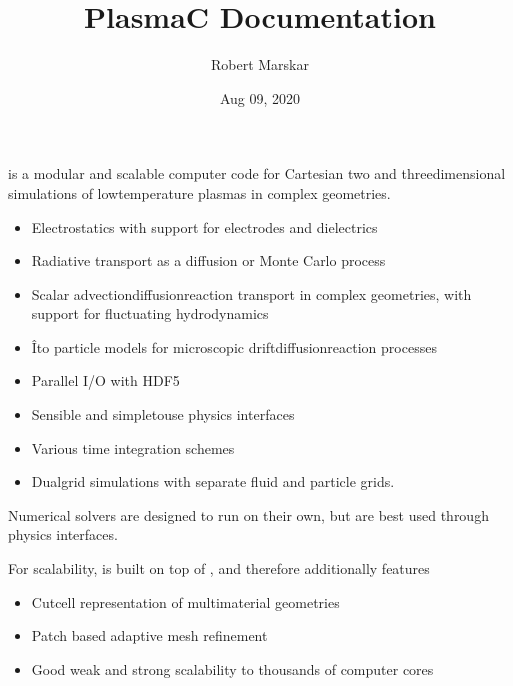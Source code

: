 \documentclass[letterpaper,10pt,english]{sphinxmanual}
\title{PlasmaC Documentation}
\date{Aug 09, 2020}
\author{Robert Marskar}
\begin{document}
\pagestyle{empty}
\sphinxmaketitle
\pagestyle{plain}
\sphinxtableofcontents
\pagestyle{normal}
\label{\detokenize{index::doc}}



 is a modular and scalable computer code for Cartesian two\sphinxhyphen{} and three\sphinxhyphen{}dimensional simulations of low\sphinxhyphen{}temperature plasmas in complex geometries.
\begin{itemize}
\item {} 
Electrostatics with support for electrodes and dielectrics

\item {} 
Radiative transport as a diffusion or Monte Carlo process

\item {} 
Scalar advection\sphinxhyphen{}diffusion\sphinxhyphen{}reaction transport in complex geometries, with support for fluctuating hydrodynamics

\item {} 
Îto particle models for microscopic drift\sphinxhyphen{}diffusion\sphinxhyphen{}reaction processes

\item {} 
Parallel I/O with HDF5

\item {} 
Sensible and simple\sphinxhyphen{}to\sphinxhyphen{}use physics interfaces

\item {} 
Various time integration schemes

\item {} 
Dual\sphinxhyphen{}grid simulations with separate fluid and particle grids.

\end{itemize}

Numerical solvers are designed to run on their own, but are best used through physics interfaces.

For scalability,  is built on top of , and therefore additionally features
\begin{itemize}
\item {} 
Cut\sphinxhyphen{}cell representation of multi\sphinxhyphen{}material geometries

\item {} 
Patch based adaptive mesh refinement

\item {} 
Good weak and strong scalability to thousands of computer cores

\end{itemize}
\end{document}

